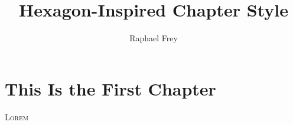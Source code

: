 \documentclass[a4paper,oneside,11pt]{memoir}
\title{Hexagon-Inspired Chapter Style}
\author{Raphael Frey}
\begin{document}

\begin{titlingpage}
    \maketitle
\end{titlingpage}

\frontmatter
\begin{abstract}
    \lipsum[1-2]
\end{abstract}
\newpage
\tableofcontents*

\mainmatter
\chapter{This Is the First Chapter}
\lettrine{\textcolor[gray]{0.5}{L}}{orem} \lipsum[1-3]
\end{document}
